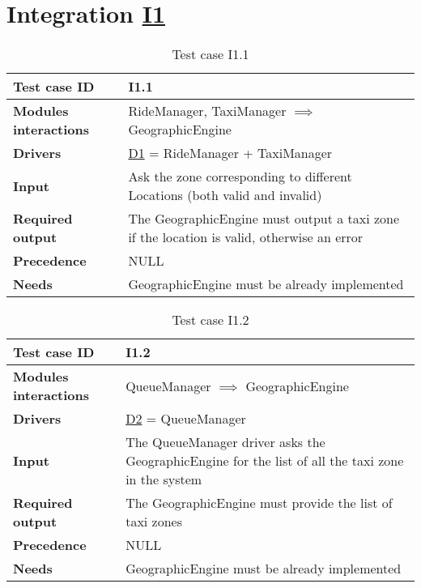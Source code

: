 \section{Integration \hyperref[I1]{I1} \label{int_I1}}
\begin{table}[H]
\begin{tabular}{ l | p{} }
\textbf{Test case ID} & I1.1 \\ \hline
\textbf{Modules interactions} & RideManager, TaxiManager $\implies$ GeographicEngine \\ \hline
\textbf{Drivers} &  \hyperref[D1]{D1} = RideManager + TaxiManager \\ \hline
\textbf{Input} & Ask the zone corresponding to different Locations (both valid and invalid) \\ \hline
\textbf{Required output} & The GeographicEngine must output a taxi zone if the location is valid, otherwise an error \\ \hline
\textbf{Precedence} & NULL \\ \hline
\textbf{Needs} & GeographicEngine must be already implemented
\end{tabular}
\caption{Test case I1.1}
\end{table}

\begin{table}[H]
\begin{tabular}{ l | p{} }
\textbf{Test case ID} & I1.2 \\ \hline
\textbf{Modules interactions} & QueueManager $\implies$ GeographicEngine \\ \hline
\textbf{Drivers} &  \hyperref[D2]{D2} = QueueManager \\ \hline
\textbf{Input} & The QueueManager driver asks the GeographicEngine for the list of all the taxi zone in the system \\ \hline
\textbf{Required output} & The GeographicEngine must provide the list of taxi zones \\ \hline
\textbf{Precedence} & NULL \\ \hline
\textbf{Needs} & GeographicEngine must be already implemented
\end{tabular}
\caption{Test case I1.2}
\end{table}

